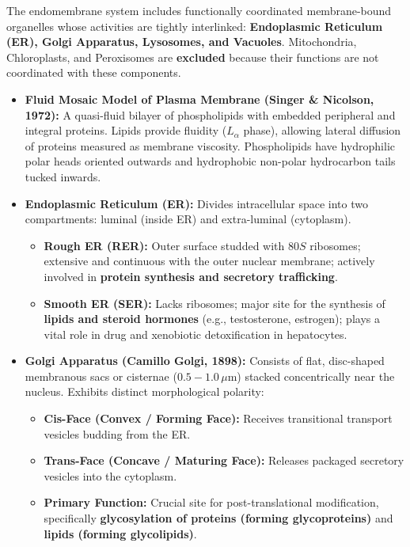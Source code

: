 \documentclass[10pt,twoside,openright]{book}
\begin{document}
\begin{conceptbox}
The endomembrane system includes functionally coordinated membrane-bound organelles whose activities are tightly interlinked: \textbf{Endoplasmic Reticulum (ER), Golgi Apparatus, Lysosomes, and Vacuoles}. Mitochondria, Chloroplasts, and Peroxisomes are \textbf{excluded} because their functions are not coordinated with these components.

\begin{itemize}[leftmargin=*]
  \item \textbf{Fluid Mosaic Model of Plasma Membrane (Singer \& Nicolson, 1972):}
  A quasi-fluid bilayer of phospholipids with embedded peripheral and integral proteins. Lipids provide fluidity ($L_\alpha$ phase), allowing lateral diffusion of proteins measured as membrane viscosity. Phospholipids have hydrophilic polar heads oriented outwards and hydrophobic non-polar hydrocarbon tails tucked inwards.

  \item \textbf{Endoplasmic Reticulum (ER):}
  Divides intracellular space into two compartments: luminal (inside ER) and extra-luminal (cytoplasm).
  \begin{itemize}
    \item \textbf{Rough ER (RER):} Outer surface studded with $80S$ ribosomes; extensive and continuous with the outer nuclear membrane; actively involved in \textbf{protein synthesis and secretory trafficking}.
    \item \textbf{Smooth ER (SER):} Lacks ribosomes; major site for the synthesis of \textbf{lipids and steroid hormones} (e.g., testosterone, estrogen); plays a vital role in drug and xenobiotic detoxification in hepatocytes.
  \end{itemize}

  \item \textbf{Golgi Apparatus (Camillo Golgi, 1898):}
  Consists of flat, disc-shaped membranous sacs or cisternae ($0.5-1.0\,\mu\mathrm{m}$) stacked concentrically near the nucleus. Exhibits distinct morphological polarity:
  \begin{itemize}
    \item \textbf{Cis-Face (Convex / Forming Face):} Receives transitional transport vesicles budding from the ER.
    \item \textbf{Trans-Face (Concave / Maturing Face):} Releases packaged secretory vesicles into the cytoplasm.
    \item \textbf{Primary Function:} Crucial site for post-translational modification, specifically \textbf{glycosylation of proteins (forming glycoproteins)} and \textbf{lipids (forming glycolipids)}.
  \end{itemize}


\end{itemize}
\end{conceptbox}
\end{document}
